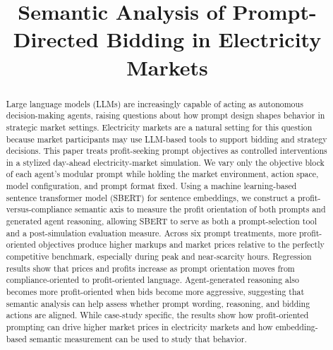\documentclass[conference]{IEEEtran}
\begin{document}
\title{Semantic Analysis of Prompt-Directed Bidding in Electricity Markets}

\author{
}

\maketitle


\begin{abstract}
Large language models (LLMs) are increasingly capable of acting as autonomous decision-making agents, raising questions about how prompt design shapes behavior in strategic market settings. Electricity markets are a natural setting for this question because market participants may use LLM-based tools to support bidding and strategy decisions. This paper treats profit-seeking prompt objectives as controlled interventions in a stylized day-ahead electricity-market simulation. We vary only the objective block of each agent's modular prompt while holding the market environment, action space, model configuration, and prompt format fixed. Using a machine learning-based sentence transformer model (SBERT) for sentence embeddings, we construct a profit-versus-compliance semantic axis to measure the profit orientation of both prompts and generated agent reasoning, allowing SBERT to serve as both a prompt-selection tool and a post-simulation evaluation measure. Across six prompt treatments, more profit-oriented objectives produce higher markups and market prices relative to the perfectly competitive benchmark, especially during peak and near-scarcity hours. Regression results show that prices and profits increase as prompt orientation moves from compliance-oriented to profit-oriented language. Agent-generated reasoning also becomes more profit-oriented when bids become more aggressive, suggesting that semantic analysis can help assess whether prompt wording, reasoning, and bidding actions are aligned. While case-study specific, the results show how profit-oriented prompting can drive higher market prices in electricity markets and how embedding-based semantic measurement can be used to study that behavior.

\end{abstract}
\end{document}
